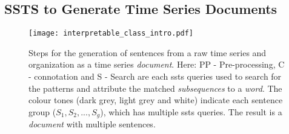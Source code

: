 %
%
%
%
%
%

\subsection{SSTS to Generate Time Series Documents}

\begin{figure}[!h]
    \centering
    \texttt{[image: interpretable\_class\_intro.pdf]}
    \caption{Steps for the generation of sentences from a raw time series and organization as a time series \textit{document}. Here: {PP - Pre-processing, C - connotation and S - Search} are each \gls{ssts} queries used to search for the patterns and attribute the matched \textit{subsequences} to a \textit{word}. The colour tones (dark grey, light grey and white) indicate each sentence group ($S_1, S_2, ..., S_g$), which has multiple \gls{ssts} queries. The result is a \textit{document} with multiple sentences.}
    \label{fig:interpretable_intro}
\end{figure}

